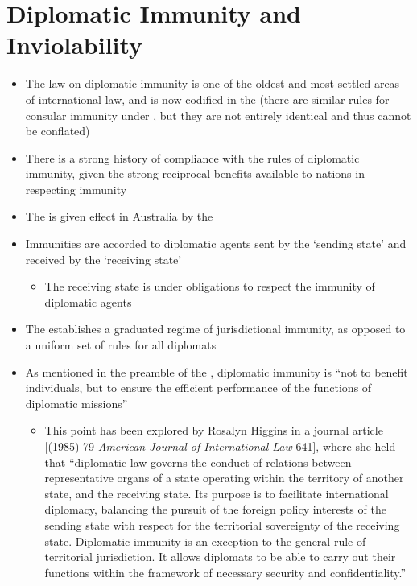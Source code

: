 \section{Diplomatic Immunity and Inviolability}
\begin{itemize}
    \item The law on diplomatic immunity is one of the oldest and most settled areas of international law, and is now codified in the   (there are similar rules for consular immunity under , but they are not entirely identical and thus cannot be conflated)
    \item There is a strong history of compliance with the rules of diplomatic immunity, given the strong reciprocal benefits available to nations in respecting immunity
    \item The  is given effect in Australia by the 
    \item Immunities are accorded to diplomatic agents sent by the `sending state' and received by the `receiving state'
    \begin{itemize}
        \item The receiving state is under obligations to respect the immunity of diplomatic agents
    \end{itemize}
    \item The  establishes a graduated regime of jurisdictional immunity, as opposed to a uniform set of rules for all diplomats
    \item As mentioned in the preamble of the , diplomatic immunity is ``not to benefit individuals, but to ensure the efficient performance of the functions of diplomatic missions''
    \begin{itemize}
        \item This point has been explored by Rosalyn Higgins in a journal article [(1985) 79 \textit{American Journal of International Law} 641], where she held that ``diplomatic law governs the conduct of relations between representative organs of a state operating within the territory of another state, and the receiving state. Its purpose is to facilitate international diplomacy, balancing the pursuit of the foreign policy interests of the sending state with respect for the territorial sovereignty of the receiving state. Diplomatic immunity is an exception to the general rule of territorial jurisdiction. It allows diplomats to be able to carry out their functions within the framework of necessary security and confidentiality.''

\end{itemize}
\end{itemize}
